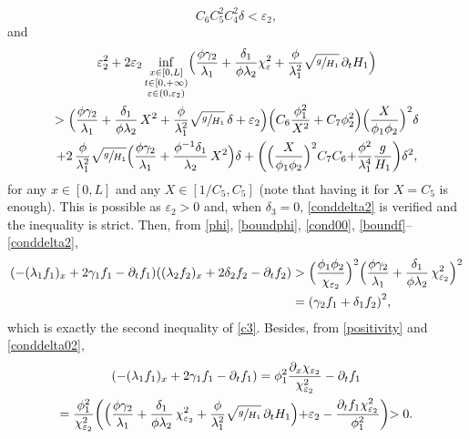 \documentclass[JEP,XML,SOM,Unicode]{cedram}
\theoremstyle{definition}
\begin{document}
\begin{equation}
\label{conddelta02}
C_{6}C_{5}^{2}C_{4}^{2}\delta<\varepsilon_{2},
\end{equation}
and
\begin{multline}
\label{conddelta2}
\varepsilon_{2}^{2}+2\varepsilon_{2}\inf_{\substack{x\in[0,L]\\ t\in[0,+\infty)\\\varepsilon\in(0,\varepsilon_{2})}}\Bigl(\frac{\phi \gamma_{2}}{\lambda_{1}}+\frac{\delta_{1}}{\phi\lambda_{2}}\chi_{\varepsilon}^{2}+{\frac{\phi}{\lambda_{1}^{2}}}\sqrt{\sfrac{g}{H_{1}}}\,\partial_{t} H_{1} \Bigl)\\
> \Bigl(\frac{\phi \gamma_{2}}{\lambda_{1}}+\frac{\delta_{1}}{\phi\lambda_{2}}\,X^{2}+{\frac{\phi}{\lambda_{1}^{2}}}\sqrt{\sfrac{g}{H_{1}}}\,\delta+\varepsilon_{2} \Bigr) \Bigl(C_{6}\frac{\phi_{1}^{2}}{X^{2}}+C_{7}\phi_{2}^{2} \Bigr) \Bigl(\frac{X}{\phi_{1}\phi_{2}} \Bigr)^{2}\delta\\
+2\,\frac{\phi}{\lambda_{1}^{2}}\sqrt{\sfrac{g}{H_{1}}} \Bigl(\frac{\phi\gamma_{2}}{\lambda_{1}}+\frac{\phi^{-1}\delta_{1}}{\lambda_{2}}\,X^{2} \Bigr)\delta+\biggl(\Bigl(\frac{X}{\phi_{1}\phi_{2}} \Bigr)^{2}C_{7}C_{6}{+\frac{\phi^{2}}{\lambda_{1}^{4}}\frac{g}{H_{1}}}\biggr)\delta^{2},
\end{multline}
for any $x\in[0,L]$ and any $X\in[1/C_{5},C_{5}]$ ({note} that having it for $X=C_{5}$ is enough). This is possible as $\varepsilon_{2}>0$ and, when $\delta_{3}=0$,
\eqref{conddelta2} is verified and the inequality is strict.
Then, from \eqref{phi}, \eqref{boundphi}, \eqref{cond00}, \eqref{boundf}--\eqref{conddelta2},
\begin{equation*}
\begin{split}
(-(\lambda_{1}f_{1})_{x}+2\gamma_{1}f_{1}-\partial_{t}f_{1})((\lambda_{2}f_{2})_{x}+2\delta_{2}f_{2}-\partial_{t}f_{2})&>
\Bigl(\frac{\phi_{1}\phi_{2}}{\chi_{\varepsilon_{2}}} \Bigr)^{2} \Bigl(\frac{\phi \gamma_{2}}{\lambda_{1}}+\frac{\delta_{1}}{\phi\lambda_{2}}\,\chi_{\varepsilon_{2}}^{2} \Bigr)^{2}\\
&={\left(\gamma_{2}f_{1}+\delta_{1}f_{2}\right)^{2}},\\
\end{split}
\end{equation*}
which is exactly the second inequality of \eqref{c3}. Besides,
from \eqref{positivity} and \eqref{conddelta02},
\begin{multline*}
(-(\lambda_{1}f_{1})_{x}+2\gamma_{1}f_{1}-\partial_{t}f_{1})=\phi_{1}^{2}\frac{\partial_{x}\chi_{\varepsilon_{2}}}{\chi^{2}_{\varepsilon_{2}}}
-\partial_{t}f_{1}
\\
=\frac{\phi_{1}^{2}}{\chi_{\varepsilon_{2}}^{2}}\biggl(
\Bigl(\frac{\phi\gamma_{2}}{\lambda_{1}}+\frac{\delta_{1}}{\phi\lambda_{2}}\,{\chi}_{{\varepsilon_{2}}}^{2}+{\frac{\phi}{\lambda_{1}^{2}}}\sqrt{\sfrac{g}{H_{1}}}\,\partial_{t} H_{1} \Bigl)+{\varepsilon_{2}}
-\frac{\partial_{t}f_{1}\chi_{\varepsilon_{2}}^{2}}{\phi_{1}^{2}}
\biggl)>0.
\end{multline*}
\end{document}
